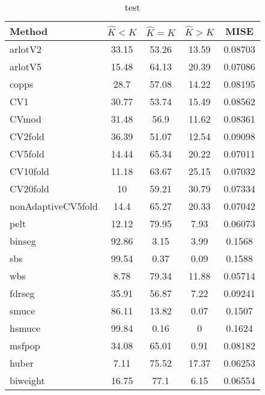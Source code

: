\begin{table}[ht]
\centering
\begin{tabular}{l|cccc}
  \hline
Method & $\hat{K} < K$ & $\hat{K} = K$ & $\hat{K} > K$ & MISE \\ 
  \hline
arlotV2 & 33.15 & 53.26 & 13.59 & 0.08703 \\ 
  arlotV5 & 15.48 & 64.13 & 20.39 & 0.07086 \\ 
  copps &  28.7 & 57.08 & 14.22 & 0.08195 \\ 
  CV1 & 30.77 & 53.74 & 15.49 & 0.08562 \\ 
  CVmod & 31.48 &  56.9 & 11.62 & 0.08361 \\ 
  CV2fold & 36.39 & 51.07 & 12.54 & 0.09098 \\ 
  CV5fold & 14.44 & 65.34 & 20.22 & 0.07011 \\ 
  CV10fold & 11.18 & 63.67 & 25.15 & 0.07032 \\ 
  CV20fold &    10 & 59.21 & 30.79 & 0.07334 \\ 
  nonAdaptiveCV5fold &  14.4 & 65.27 & 20.33 & 0.07042 \\ 
  pelt & 12.12 & 79.95 &  7.93 & 0.06073 \\ 
  binseg & 92.86 &  3.15 &  3.99 & 0.1568 \\ 
  sbs & 99.54 &  0.37 &  0.09 & 0.1588 \\ 
  wbs &  8.78 & 79.34 & 11.88 & 0.05714 \\ 
  fdrseg & 35.91 & 56.87 &  7.22 & 0.09241 \\ 
  smuce & 86.11 & 13.82 &  0.07 & 0.1507 \\ 
  hsmuce & 99.84 &  0.16 &     0 & 0.1624 \\ 
  msfpop & 34.08 & 65.01 &  0.91 & 0.08182 \\ 
  huber &  7.11 & 75.52 & 17.37 & 0.06253 \\ 
  biweight & 16.75 &  77.1 &  6.15 & 0.06554 \\ 
   \hline
\end{tabular}
\caption{test} 
\end{table}
